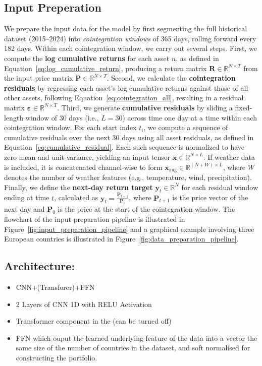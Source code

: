 \documentclass[12pt]{article}
\begin{document}
\subsection*{Input Preperation}

We prepare the input data for the model by first segmenting the full historical dataset (2015–2024) into \textit{cointegration windows} of 365 days, rolling forward every 182 days. Within each cointegration window, we carry out several steps. First, we compute the \textbf{log cumulative returns} for each asset \( n \), as defined in Equation~\eqref{eq:log_cumulative_return}, producing a return matrix \( \mathbf{R} \in \mathbb{R}^{N \times T} \) from the input price matrix \( \mathbf{P} \in \mathbb{R}^{N \times T} \). Second, we calculate the \textbf{cointegration residuals} by regressing each asset’s log cumulative returns against those of all other assets, following Equation~\eqref{eq:cointegration_all}, resulting in a residual matrix \( \boldsymbol{\varepsilon} \in \mathbb{R}^{N \times T} \). Third, we generate \textbf{cumulative residuals} by sliding a fixed-length window of 30 days (i.e., \( L = 30 \)) across time one day at a time within each cointegration window. For each start index \( t_i \), we compute a sequence of cumulative residuals over the next 30 days using all asset residuals, as defined in Equation~\eqref{eq:cumulative_residual}. Each such sequence is normalized to have zero mean and unit variance, yielding an input tensor \( \mathbf{x} \in \mathbb{R}^{N \times L} \). If weather data is included, it is concatenated channel-wise to form \( \mathbf{x}_{\text{aug}} \in \mathbb{R}^{(N + W) \times L} \), where \( W \) denotes the number of weather features (e.g., temperature, wind, precipitation). Finally, we define the \textbf{next-day return target} \( \mathbf{y}_t \in \mathbb{R}^N \) for each residual window ending at time \( t \), calculated as \( \mathbf{y}_t = \frac{\mathbf{P}_{t+1}}{\mathbf{P}_0} \), where \( \mathbf{P}_{t+1} \) is the price vector of the next day and \( \mathbf{P}_0 \) is the price at the start of the cointegration window.
\noindent
The flowchart of the input preparation pipeline is illustrated in Figure~\ref{fig:input_preparation_pipeline} and a graphical example involving three European countries is illustrated in Figure~\ref{fig:data_preparation_pipeline}.


\subsection*{Architecture:}
\begin{itemize}
    \item CNN+(Transforer)+FFN
    \item 2 Layers of CNN 1D with RELU Activation
    \item Transformer component in the  (can be turned off)
    \item FFN which ouput the learned underlying feature of the data into a vector the same size of the number of countries in the dataset, and soft normalised for constructing the portfolio.
\end{itemize}
\end{document}
